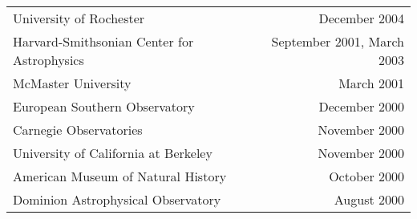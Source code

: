 \documentclass[12pt]{article}
\begin{document}
\begin{tabularx}{\textwidth}{Xr}
University of Rochester& December 2004\\
Harvard-Smithsonian Center for Astrophysics& September 2001, March 2003\\
McMaster University& March 2001\\
European Southern Observatory& December 2000\\
Carnegie Observatories& November 2000\\
University of California at Berkeley& November 2000\\
American Museum of Natural History& October 2000\\
Dominion Astrophysical Observatory& August 2000\\
\end{tabularx}

\clearpage

\begin{publications}

\printbibliography[title={Refereed publications},keyword=ref]

\setcounter{papers}{0}
\printbibliography[title={Conference presentations},keyword=unref]


\end{publications}
\end{document}
